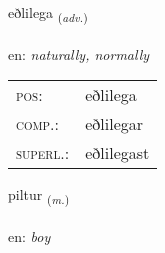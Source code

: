 \documentclass[frontgrid, backgrid]{flacards}\usepackage[]{graphicx}\usepackage[]{xcolor}
\begin{document}
\renewcommand{\flhead}{\vskip5pt \fboxsep=0pt {\small\bfseries\footnotesize Atviksorð | Adverb}}
\renewcommand{\fcfoot}{\vskip5pt \fboxsep=0pt \hspace{2pt}{\small\bfseries\footnotesize 3K}}

\renewcommand{\blhead}{\vskip5pt {\small\bfseries\footnotesize Atviksorð | Adverb }}
\renewcommand{\bcfoot}{\vskip5pt \hspace{2pt}{\small\bfseries\footnotesize 3K}}


{eðlilega \small{\textsubscript{(\textit{adv.})}} \\[1ex] %
\textphonetic{[ɛðlɪlɛɣa]} \\
en: \emph{naturally, normally} \\  [2ex]
\renewcommand*{\arraystretch}{0.8}
\begin{tabular}{ll}
\textsc{pos}: & eðlilega \\ 
\textsc{comp.}: & eðlilegar \\ 
\textsc{superl.}: & eðlilegast \\
\end{tabular}
}

\renewcommand{\flhead}{\vskip5pt \fboxsep=0pt {\small\bfseries\footnotesize Nafnorð | Noun}}
\renewcommand{\fcfoot}{\vskip5pt \fboxsep=0pt \hspace{2pt}{\small\bfseries\footnotesize 3K}}

\renewcommand{\blhead}{\vskip5pt {\small\bfseries\footnotesize Nafnorð | Noun }}
\renewcommand{\bcfoot}{\vskip5pt \hspace{2pt}{\small\bfseries\footnotesize 3K}}


{piltur \small{\textsubscript{(\textit{m.})}} \\[1ex] %
 \\
en: \emph{boy} \\  [2ex]
\renewcommand*{\arraystretch}{0.8}
}
\end{document}
